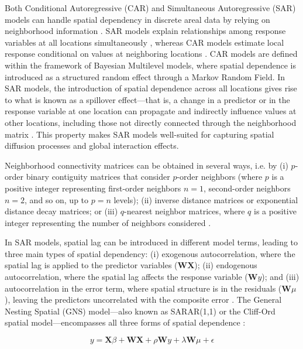 \documentclass[lineno,pdflatex,sn-basic]{sn-jnl}%
\theoremstyle{thmstyleone}%
\theoremstyle{thmstyletwo}%
\theoremstyle{thmstylethree}%
\begin{document}
Both Conditional Autoregressive (CAR) and Simultaneous Autoregressive (SAR) models can handle spatial dependency in discrete areal data by relying on neighborhood information \citep{wall2004close, jaya2021spatial, cressie2015statistics}. 
SAR models explain relationships among response variables at all locations simultaneously \citep{ver2018spatial, jaya2021spatial}, whereas CAR models estimate local response conditional on values at neighboring locations \citep{anselin1988spatial}.  
CAR models are defined within the framework of Bayesian Multilevel models, where spatial dependence is introduced as a structured random effect through a Markov Random Field. 
In SAR models, the introduction of spatial dependence across all locations gives rise to what is known as a spillover effect—that is, a change in a predictor or in the response variable at one location can propagate and indirectly influence values at other locations, including those not directly connected through the neighborhood matrix \citep{lesage2014spatial}. 
This property makes SAR models well-suited for capturing spatial diffusion processes and global interaction effects. 

Neighborhood connectivity matrices can be obtained in several ways, i.e. by (i) $p$-order binary contiguity matrices that consider $p$-order neighbors (where $p$ is a positive integer representing first-order neighbors $n=1$, second-order neighbors $n=2$, and so on, up to $p=n$ levels); (ii) inverse distance matrices or exponential distance decay matrices; or (iii) $q$-nearest neighbor matrices, where $q$ is a positive integer representing the number of neighbors considered \citep{getis2004constructing, getis2009spatial, stakhovych2009specification}.

In SAR models, spatial lag can be introduced in different model terms, leading to three main types of spatial dependency: (i) exogenous autocorrelation, where the spatial lag is applied to the predictor variables ($\mathbf{W} \mathbf{X}$); (ii) endogenous autocorrelation, where the spatial lag affects the response variable ($\mathbf{W} y$); and (iii) autocorrelation in the error term, where spatial structure is in the residuals ($\mathbf{W} \mu$), leaving the predictors uncorrelated with the composite error \citep{anselin1988spatial}. The General Nesting Spatial (GNS) model—also known as SARAR(1,1) or the Cliff-Ord spatial model—encompasses all three forms of spatial dependence \citep{lesage2009introduction, kelejian2007relative, cliff1981spatial}:

\begin{equation} \label{eq:SAR}
y = \textbf{X} \beta  + \textbf{W} \textbf{X} + \rho \textbf{W} y + \lambda \textbf{W} \mu + \epsilon
\end{equation}
\end{document}
